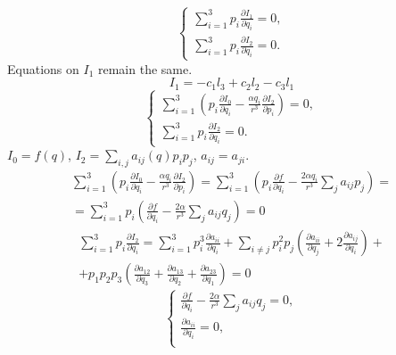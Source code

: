 \documentclass[12pt]{article}
\theoremstyle{definition}
\begin{document}
\begin{enumerate}
\begin{itemize}
\begin{itemize}
\begin{equation}
\begin{cases}
                    \sum\limits_{i=1}^3p_i\frac{\partial I_1}{\partial q_i}=0,\\
                    \sum\limits_{i=1}^3p_i\frac{\partial I_2}{\partial q_i}=0.
            \end{cases}
            \end{equation}
            Equations on $I_1$ remain the same.
            \begin{equation}
                I_1=-c_1l_3+c_2l_2-c_3l_1
            \end{equation}
            \begin{equation}
                \begin{cases}
                    \sum\limits_{i=1}^3\left(p_i\frac{\partial I_0}{\partial q_i}-\frac{\alpha q_i}{r^3}\frac{\partial I_2}{\partial p_i}\right)=0,\\
                    \sum\limits_{i=1}^3p_i\frac{\partial I_2}{\partial q_i}=0.
            \end{cases}
            \end{equation}
            $I_0=f(q)$, $I_2=\sum\limits_{i,j}a_{ij}(q)p_ip_j$, $a_{ij}=a_{ji}$.
            \begin{multline}
                \sum\limits_{i=1}^3\left(p_i\frac{\partial I_0}{\partial q_i}-\frac{\alpha q_i}{r^3}\frac{\partial I_2}{\partial p_i}\right)=\sum\limits_{i=1}^3\left(p_i\frac{\partial f}{\partial q_i}-\frac{2\alpha q_i}{r^3}\sum\limits_ja_{ij}p_j\right)=\\=\sum\limits_{i=1}^3p_i\left(\frac{\partial f}{\partial q_i}-\frac{2\alpha}{r^3}\sum\limits_ja_{ij}q_j\right)=0
            \end{multline}
            \begin{multline}
                \sum\limits_{i=1}^3p_i\frac{\partial I_2}{\partial q_i}=\sum\limits_{i=1}^3p^3_i\frac{\partial a_{ii}}{\partial q_i}+\sum\limits_{i\neq j}p_i^2p_j\left(\frac{\partial a_{ii}}{\partial q_j}+2\frac{\partial a_{ij}}{\partial q_i}\right)+\\+p_1p_2p_3\left(\frac{\partial a_{12}}{\partial q_3}+\frac{\partial a_{13}}{\partial q_2}+\frac{\partial a_{23}}{\partial q_1}\right)=0
            \end{multline}
            \begin{equation}
                \begin{cases}
                    \frac{\partial f}{\partial q_i}-\frac{2\alpha}{r^3}\sum\limits_ja_{ij}q_j=0,\\
                    \frac{\partial a_{ii}}{\partial q_i}=0,\\

\end{cases}
\end{equation}
\end{itemize}
\end{itemize}
\end{enumerate}
\end{document}
